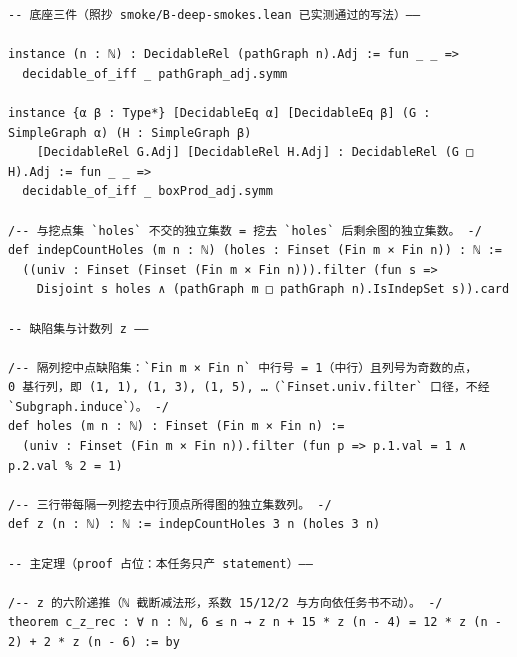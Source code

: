 \documentclass[11pt]{article}
\begin{document}
\begin{lstlisting}[caption={Frozen base definitions and the head of
Theorem~\ref{thm:rec}, verbatim lines 21--48 of
\texttt{formalized/statement.lean} (sha256 \texttt{b726f0d8}): the two
decidability instances, \texttt{indepCountHoles}, \texttt{holes},
\texttt{z}, and the theorem statement. The frozen file's proof body
and its \texttt{native\_decide}
data-check lines are excluded.},label={lst:s1}]
-- 底座三件（照抄 smoke/B-deep-smokes.lean 已实测通过的写法）——

instance (n : ℕ) : DecidableRel (pathGraph n).Adj := fun _ _ =>
  decidable_of_iff _ pathGraph_adj.symm

instance {α β : Type*} [DecidableEq α] [DecidableEq β] (G : SimpleGraph α) (H : SimpleGraph β)
    [DecidableRel G.Adj] [DecidableRel H.Adj] : DecidableRel (G □ H).Adj := fun _ _ =>
  decidable_of_iff _ boxProd_adj.symm

/-- 与挖点集 `holes` 不交的独立集数 = 挖去 `holes` 后剩余图的独立集数。 -/
def indepCountHoles (m n : ℕ) (holes : Finset (Fin m × Fin n)) : ℕ :=
  ((univ : Finset (Finset (Fin m × Fin n))).filter (fun s =>
    Disjoint s holes ∧ (pathGraph m □ pathGraph n).IsIndepSet s)).card

-- 缺陷集与计数列 z ——

/-- 隔列挖中点缺陷集：`Fin m × Fin n` 中行号 = 1（中行）且列号为奇数的点，
0 基行列，即 (1, 1), (1, 3), (1, 5), …（`Finset.univ.filter` 口径，不经 `Subgraph.induce`）。 -/
def holes (m n : ℕ) : Finset (Fin m × Fin n) :=
  (univ : Finset (Fin m × Fin n)).filter (fun p => p.1.val = 1 ∧ p.2.val % 2 = 1)

/-- 三行带每隔一列挖去中行顶点所得图的独立集数列。 -/
def z (n : ℕ) : ℕ := indepCountHoles 3 n (holes 3 n)

-- 主定理（proof 占位：本任务只产 statement）——

/-- z 的六阶递推（ℕ 截断减法形，系数 15/12/2 与方向依任务书不动）。 -/
theorem c_z_rec : ∀ n : ℕ, 6 ≤ n → z n + 15 * z (n - 4) = 12 * z (n - 2) + 2 * z (n - 6) := by
\end{lstlisting}
\end{document}
